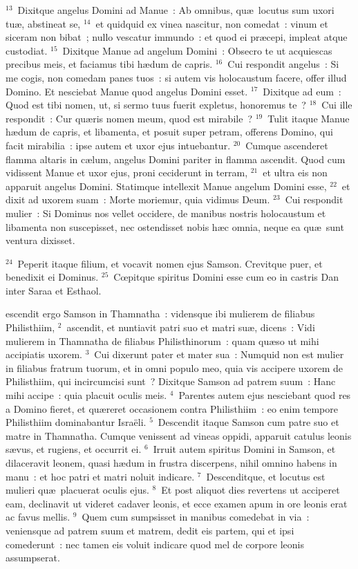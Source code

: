 ${}^{13}$~Dixitque angelus Domini ad Manue~: Ab omnibus, qu\ae\ locutus sum uxori tu\ae , abstineat se,
${}^{14}$~et quidquid ex vinea nascitur, non comedat~: vinum et siceram non bibat~; nullo vescatur immundo~: et quod ei pr\ae cepi, impleat atque custodiat.
${}^{15}$~Dixitque Manue ad angelum Domini~: Obsecro te ut acquiescas precibus meis, et faciamus tibi h\ae dum de capris.
${}^{16}$~Cui respondit angelus~: Si me cogis, non comedam panes tuos~: si autem vis holocaustum facere, offer illud Domino. Et nesciebat Manue quod angelus Domini esset.
${}^{17}$~Dixitque ad eum~: Quod est tibi nomen, ut, si sermo tuus fuerit expletus, honoremus te~?
${}^{18}$~Cui ille respondit~: Cur qu\ae ris nomen meum, quod est mirabile~?
${}^{19}$~Tulit itaque Manue h\ae dum de capris, et libamenta, et posuit super petram, offerens Domino, qui facit mirabilia~: ipse autem et uxor ejus intuebantur.
${}^{20}$~Cumque ascenderet flamma altaris in c\ae lum, angelus Domini pariter in flamma ascendit. Quod cum vidissent Manue et uxor ejus, proni ceciderunt in terram,
${}^{21}$~et ultra eis non apparuit angelus Domini. Statimque intellexit Manue angelum Domini esse,
${}^{22}$~et dixit ad uxorem suam~: Morte moriemur, quia vidimus Deum.
${}^{23}$~Cui respondit mulier~: Si Dominus nos vellet occidere, de manibus nostris holocaustum et libamenta non suscepisset, nec ostendisset nobis h\ae c omnia, neque ea qu\ae\ sunt ventura dixisset.


${}^{24}$~Peperit itaque filium, et vocavit nomen ejus Samson. Crevitque puer, et benedixit ei Dominus.
${}^{25}$~Cœpitque spiritus Domini esse cum eo in castris Dan inter Saraa et Esthaol.

\bchapter
{}escendit ergo Samson in Thamnatha~: vidensque ibi mulierem de filiabus Philisthiim,
${}^{2}$~ascendit, et nuntiavit patri suo et matri su\ae , dicens~: Vidi mulierem in Thamnatha de filiabus Philisthinorum~: quam qu\ae so ut mihi accipiatis uxorem.
${}^{3}$~Cui dixerunt pater et mater sua~: Numquid non est mulier in filiabus fratrum tuorum, et in omni populo meo, quia vis accipere uxorem de Philisthiim, qui incircumcisi sunt~? Dixitque Samson ad patrem suum~: Hanc mihi accipe~: quia placuit oculis meis.
${}^{4}$~Parentes autem ejus nesciebant quod res a Domino fieret, et qu\ae reret occasionem contra Philisthiim~: eo enim tempore Philisthiim dominabantur Isra\"eli.
${}^{5}$~Descendit itaque Samson cum patre suo et matre in Thamnatha. Cumque venissent ad vineas oppidi, apparuit catulus leonis s\ae vus, et rugiens, et occurrit ei.
${}^{6}$~Irruit autem spiritus Domini in Samson, et dilaceravit leonem, quasi h\ae dum in frustra discerpens, nihil omnino habens in manu~: et hoc patri et matri noluit indicare.
${}^{7}$~Descenditque, et locutus est mulieri qu\ae\ placuerat oculis ejus.
${}^{8}$~Et post aliquot dies revertens ut acciperet eam, declinavit ut videret cadaver leonis, et ecce examen apum in ore leonis erat ac favus mellis.
${}^{9}$~Quem cum sumpsisset in manibus comedebat in via~: veniensque ad patrem suum et matrem, dedit eis partem, qui et ipsi comederunt~: nec tamen eis voluit indicare quod mel de corpore leonis assumpserat.


